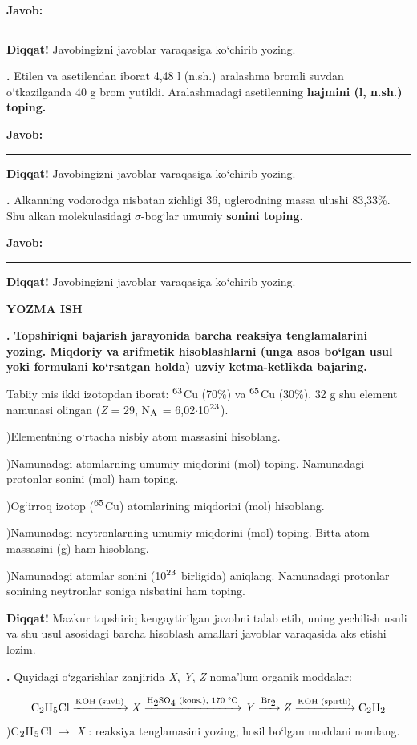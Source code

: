 \documentclass[11pt,a4paper]{article}
\renewcommand{\textsubscript}[1]{\ensuremath{_{\text{\fontsize{8}{8}\selectfont #1}}}}
\renewcommand{\textsuperscript}[1]{\ensuremath{^{\text{\fontsize{8}{8}\selectfont #1}}}}
\newcommand{\qn}[1]{\textbf{\fontsize{11.5}{13}\selectfont #1}}
\newcommand{\qsep}{\par\vspace{1pt}\noindent\rule{0pt}{0.4pt}\par\vspace{5pt}}
\newcommand{\diqqat}[1]{\par\smallskip\noindent\textbf{Diqqat!} #1\par\medskip}
\newcommand{\javob}{\par\smallskip\noindent\textbf{Javob:} \rule[-2pt]{7.5cm}{0.4pt}\par\smallskip\noindent\textbf{Diqqat!} Javobingizni javoblar varaqasiga ko`chirib yozing.\par\medskip}
\begin{document}
\javob\qsep
\noindent\qn{39.} Etilen va asetilendan iborat 4,48 l (n.sh.) aralashma bromli suvdan o`tkazilganda 40 g brom yutildi. Aralashmadagi asetilenning \textbf{hajmini (l, n.sh.) toping.}
\javob\qsep
\noindent\qn{40.} Alkanning vodorodga nisbatan zichligi 36, uglerodning massa ulushi 83,33\%. Shu alkan molekulasidagi $\sigma$-bog`lar umumiy \textbf{sonini toping.}
\javob\qsep
\par\bigskip\begin{center}\textbf{\fontsize{13}{15}\selectfont YOZMA ISH}\end{center}
\noindent\qn{41.} \textbf{Topshiriqni bajarish jarayonida barcha reaksiya tenglamalarini yozing. Miqdoriy va arifmetik hisoblashlarni (unga asos bo`lgan usul yoki formulani ko`rsatgan holda) uzviy ketma-ketlikda bajaring.}\par\smallskip
Tabiiy mis ikki izotopdan iborat: \textsuperscript{63}Cu (70\%) va \textsuperscript{65}Cu (30\%). 32 g shu element namunasi olingan (\textit{Z} = 29, N\textsubscript{A} = 6,02$\cdot$10\textsuperscript{23}).\par
{})Elementning o`rtacha nisbiy atom massasini hisoblang.\par
{})Namunadagi atomlarning umumiy miqdorini (mol) toping. Namunadagi protonlar sonini (mol) ham toping.\par
{})Og`irroq izotop (\textsuperscript{65}Cu) atomlarining miqdorini (mol) hisoblang.\par
{})Namunadagi neytronlarning umumiy miqdorini (mol) toping. Bitta atom massasini (g) ham hisoblang.\par
{})Namunadagi atomlar sonini (10\textsuperscript{23} birligida) aniqlang. Namunadagi protonlar sonining neytronlar soniga nisbatini ham toping.\par
\diqqat{Mazkur topshiriq kengaytirilgan javobni talab etib, uning yechilish usuli va shu usul asosidagi barcha hisoblash amallari javoblar varaqasida aks etishi lozim.}\qsep
\noindent\qn{42.} Quyidagi o`zgarishlar zanjirida \textit{X}, \textit{Y}, \textit{Z} noma'lum organik moddalar:\par
\[\setlength{\fboxsep}{0pt}\text{C\textsubscript{2}H\textsubscript{5}Cl}\xrightarrow{\text{KOH (suvli)}}\text{\textit{X}}\xrightarrow{\text{H\textsubscript{2}SO\textsubscript{4} (kons.), 170 \textdegree{}C}}\text{\textit{Y}}\xrightarrow{\text{Br\textsubscript{2}}}\text{\textit{Z}}\xrightarrow{\text{KOH (spirtli)}}\text{C\textsubscript{2}H\textsubscript{2}}\]
)C\textsubscript{2}H\textsubscript{5}Cl $\to$ \textit{X} : reaksiya tenglamasini yozing; hosil bo`lgan moddani nomlang.\par
\end{document}
